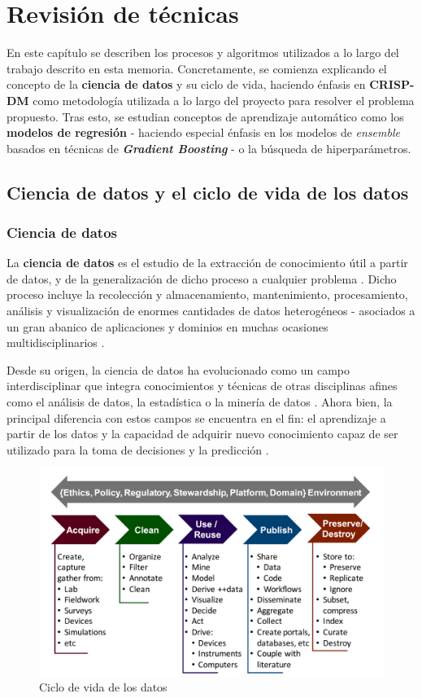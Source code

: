 \chapter{Revisión de técnicas}

En este capítulo se describen los procesos y algoritmos utilizados a lo largo del trabajo descrito en esta memoria. Concretamente, se comienza explicando el concepto de la \textbf{ciencia de datos} y su ciclo de vida, haciendo énfasis en \textbf{CRISP-DM} como metodología utilizada a lo largo del proyecto para resolver el problema propuesto. Tras esto, se estudian conceptos de aprendizaje automático como los \textbf{modelos de regresión} - haciendo especial énfasis en los modelos de \textit{ensemble} basados en técnicas de \textbf{\textit{Gradient Boosting}} - o la búsqueda de hiperparámetros.


\section{Ciencia de datos y el ciclo de vida de los datos}

\subsection{Ciencia de datos}

La \textbf{ciencia de datos} es el estudio de la extracción de conocimiento útil a partir de datos, y de la generalización de dicho proceso a cualquier problema \cite{Donoho02102017}. Dicho proceso incluye la recolección y almacenamiento, mantenimiento, procesamiento, análisis y visualización de enormes cantidades de datos heterogéneos - asociados a un gran abanico de aplicaciones y dominios en muchas ocasiones multidisciplinarios \cite{10.1145/2500499}.

Desde su origen, la ciencia de datos ha evolucionado como un campo interdisciplinar que integra conocimientos y técnicas de otras disciplinas afines como el análisis de datos, la estadística o la minería de datos \cite{potential}. Ahora bien, la principal diferencia con estos campos se encuentra en el fin: el aprendizaje a partir de los datos \cite{Donoho02102017} y la capacidad de adquirir nuevo conocimiento capaz de ser utilizado para la toma de decisiones y la predicción \cite{10.1145/2500499}.

\begin{figure}[h]
	\centering
	\includegraphics[width=0.8\linewidth]{figs/chapter2/datalifecycle}
	\caption{Ciclo de vida de los datos \cite{potential}}
	\label{fig:datalifecycle}
\end{figure}

